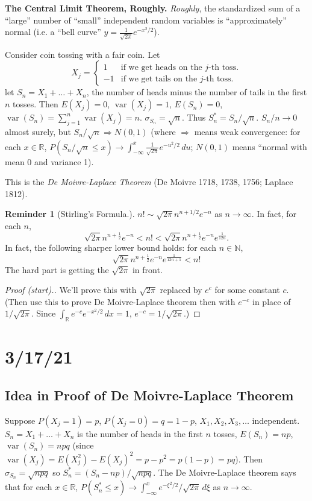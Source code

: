 \documentclass{article}
\newcommand{\R}{\mathbb{R}}
\newcommand{\N}{\mathbb{N}}
\DeclareMathOperator{\var}{var}
\theoremstyle{definition}
\newtheorem*{reminder}{Reminder}
\begin{document}
\textbf{The Central Limit Theorem, Roughly.} \emph{Roughly}, the standardized sum of a ``large'' number of ``small'' independent random variables is ``approximately'' normal (i.e. a ``bell curve'' $y = \frac{1}{\sqrt{2\pi}}e^{-x^2/2}$).

Consider coin tossing with a fair coin. Let
\[
    X_j = \begin{cases}
        1 &\text{if we get heads on the } j\text{-th toss}. \\
        -1 & \text{if we get tails on the } j\text{-th toss}.
    \end{cases}
\]
let $S_n = X_1 + \dots + X_n$, the number of heads minus the number of tails in the first $n$ tosses. Then $E(X_j) = 0$, $\var(X_j) = 1$, $E(S_n) = 0$, $\var(S_n) = \sum_{j=1}^n \var(X_j) = n$. $\sigma_{S_n} = \sqrt n$. Thus $S_n^* = S_n/\sqrt n$. $S_n/n \to 0$ almost surely, but $S_n/\sqrt n \Rightarrow N(0,1)$ (where $\Rightarrow$ means weak convergence: for each $x \in \R$, $P(S_n/\sqrt n \leq x) \to \int_{-\infty}^x \frac{1}{\sqrt{2\pi}}e^{-u^2/2} \,du$; $N(0,1)$ means ``normal with mean 0 and variance 1).

This is the \emph{De Moivre-Laplace Theorem} (De Moivre 1718, 1738, 1756; Laplace 1812).

\begin{reminder}[Stirling's Formula.]
$n! \sim \sqrt{2\pi} n^{n+1/2} e^{-n}$ as $n \to \infty$. In fact, for each $n$,
\[
    \sqrt{2\pi}n^{n+\frac{1}{2}}e^{-n} < n! < \sqrt{2\pi} n^{n+\frac{1}{2}} e^{-n}e^{\frac{1}{12n}}.
\]
In fact, the following sharper lower bound holds: for each $n \in \N$,
\[
    \sqrt{2\pi} n^{n+\frac{1}{2}} e^{-n}e^{\frac{1}{12n+1}} < n!
\]
The hard part is getting the $\sqrt{2\pi}$ in front.
\end{reminder}
\begin{proof}[Proof (start).]
    We'll prove this with $\sqrt{2\pi}$ replaced by $e^c$ for some constant $c$. (Then use this to prove De Moivre-Laplace theorem then with $e^{-c}$ in place of $1/\sqrt{2\pi}$.
    Since $\int_\R e^{-c}e^{-x^2/2}\,dx = 1$, $e^{-c} = 1/\sqrt{2\pi}$.)
\end{proof}

\section*{3/17/21}

\subsection*{Idea in Proof of De Moivre-Laplace Theorem}
Suppose $P(X_j = 1) = p$, $P(X_j = 0) = q = 1-p$, $X_1, X_2, X_3, \dots$ independent. $S_n = X_1 + \dots + X_n$ is the number of heads in the first $n$ tosses, $E(S_n) = np$, $\var(S_n) = npq$ (since $\var(X_j) = E(X_j^2) - E(X_j)^2 = p - p^2 = p(1-p) = pq$). Then $\sigma_{S_n} = \sqrt{npq}$ so $S_n^* = (S_n-np)/\sqrt{npq}$. The De Moivre-Laplace theorem says that for each $x \in \R$, $P(S_n^* \leq x) \to \int_{-\infty}^x e^{-\xi^2/2}/\sqrt{2\pi}\,d\xi$ as $n \to \infty$.
\end{document}

